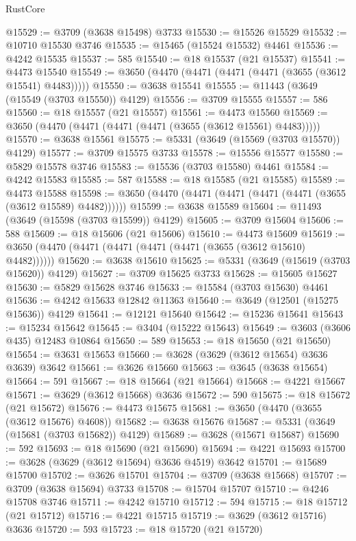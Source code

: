 \begin{lexlean}{RustCore}
\begin{coremodule}
@15529 := @3709 (@3638 @15498) @3733
@15530 := @15526 @15529
@15532 := @10710 @15530 @3746
@15535 := @15465 (@15524 @15532) @4461
@15536 := @4242 @15535
@15537 := 585
@15540 := @18 @15537 (@21 @15537)
@15541 := @4473 @15540
@15549 := @3650 (@4470 (@4471 (@4471 (@4471 (@3655 (@3612 @15541) @4483)))))
@15550 := @3638 @15541
@15555 := @11443 (@3649 (@15549 (@3703 @15550)) @4129)
@15556 := @3709 @15555
@15557 := 586
@15560 := @18 @15557 (@21 @15557)
@15561 := @4473 @15560
@15569 := @3650 (@4470 (@4471 (@4471 (@4471 (@3655 (@3612 @15561) @4483)))))
@15570 := @3638 @15561
@15575 := @5331 (@3649 (@15569 (@3703 @15570)) @4129)
@15577 := @3709 @15575 @3733
@15578 := @15556 @15577
@15580 := @5829 @15578 @3746
@15583 := @15536 (@3703 @15580) @4461
@15584 := @4242 @15583
@15585 := 587
@15588 := @18 @15585 (@21 @15585)
@15589 := @4473 @15588
@15598 := @3650 (@4470 (@4471 (@4471 (@4471 (@4471 (@3655 (@3612 @15589) @4482))))))
@15599 := @3638 @15589
@15604 := @11493 (@3649 (@15598 (@3703 @15599)) @4129)
@15605 := @3709 @15604
@15606 := 588
@15609 := @18 @15606 (@21 @15606)
@15610 := @4473 @15609
@15619 := @3650 (@4470 (@4471 (@4471 (@4471 (@4471 (@3655 (@3612 @15610) @4482))))))
@15620 := @3638 @15610
@15625 := @5331 (@3649 (@15619 (@3703 @15620)) @4129)
@15627 := @3709 @15625 @3733
@15628 := @15605 @15627
@15630 := @5829 @15628 @3746
@15633 := @15584 (@3703 @15630) @4461
@15636 := @4242 @15633 @12842 @11363
@15640 := @3649 (@12501 (@15275 @15636)) @4129
@15641 := @12121 @15640
@15642 := @15236 @15641
@15643 := @15234 @15642
@15645 := @3404 (@15222 @15643)
@15649 := @3603 (@3606 @435) @12483 @10864
@15650 := 589
@15653 := @18 @15650 (@21 @15650)
@15654 := @3631 @15653
@15660 := @3628 (@3629 (@3612 @15654) @3636 @3639) @3642
@15661 := @3626 @15660
@15663 := @3645 (@3638 @15654)
@15664 := 591
@15667 := @18 @15664 (@21 @15664)
@15668 := @4221 @15667
@15671 := @3629 (@3612 @15668) @3636
@15672 := 590
@15675 := @18 @15672 (@21 @15672)
@15676 := @4473 @15675
@15681 := @3650 (@4470 (@3655 (@3612 @15676) @4608))
@15682 := @3638 @15676
@15687 := @5331 (@3649 (@15681 (@3703 @15682)) @4129)
@15689 := @3628 (@15671 @15687)
@15690 := 592
@15693 := @18 @15690 (@21 @15690)
@15694 := @4221 @15693
@15700 := @3628 (@3629 (@3612 @15694) @3636 @4519) @3642
@15701 := @15689 @15700
@15702 := @3626 @15701
@15704 := @3709 (@3638 @15668)
@15707 := @3709 (@3638 @15694) @3733
@15708 := @15704 @15707
@15710 := @4246 @15708 @3746
@15711 := @4242 @15710
@15712 := 594
@15715 := @18 @15712 (@21 @15712)
@15716 := @4221 @15715
@15719 := @3629 (@3612 @15716) @3636
@15720 := 593
@15723 := @18 @15720 (@21 @15720)

\end{coremodule}
\end{lexlean}

